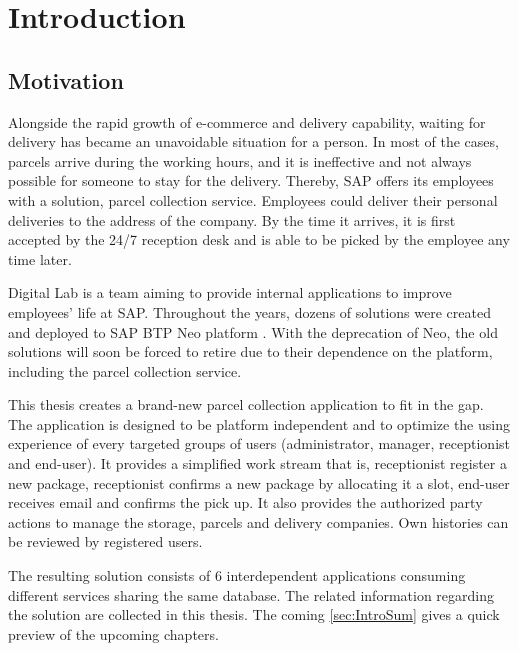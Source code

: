 \chapter{Introduction}
\label{ch:intro}

\section{Motivation}
Alongside the rapid growth of e-commerce and delivery capability, waiting for delivery has became an unavoidable situation for a person. In most of the cases, parcels arrive during the working hours, and it is ineffective and not always possible for someone to stay for the delivery. Thereby, SAP \cite{sap} offers its employees with a solution, parcel collection service. Employees could deliver their personal deliveries to the address of the company. By the time it arrives, it is first accepted by the 24/7 reception desk and is able to be picked by the employee any time later.

Digital Lab is a team aiming to provide internal applications to improve employees' life at SAP. Throughout the years, dozens of solutions were created and deployed to SAP BTP \cite{btp} Neo platform \cite{neo}. With the deprecation of Neo, the old solutions will soon be forced to retire due to their dependence on the platform, including the parcel collection service.

This thesis creates a brand-new parcel collection application to fit in the gap. The application is designed to be platform independent and to optimize the using experience of every targeted groups of users (administrator, manager, receptionist and end-user). It provides a simplified work stream that is, receptionist register a new package, receptionist confirms a new package by allocating it a slot, end-user receives email and confirms the pick up. It also provides the authorized party actions to manage the storage, parcels and delivery companies. Own histories can be reviewed by registered users.

The resulting solution consists of 6 interdependent applications consuming different services sharing the same database. The related information regarding the solution are collected in this thesis. The coming \autoref{sec:IntroSum} gives a quick preview of the upcoming chapters.


